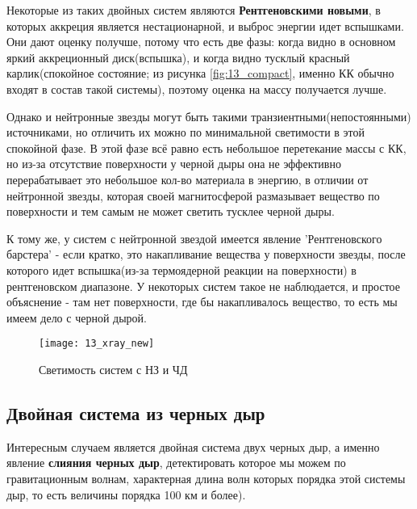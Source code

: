Некоторые из таких двойных систем являются \textbf{Рентгеновскими новыми}, в которых аккреция является нестационарной, и выброс энергии идет вспышками. Они дают оценку получше, потому что есть две фазы: когда видно в основном яркий аккреционный диск(вспышка), и когда видно тусклый красный карлик(спокойное состояние; из рисунка \ref{fig:13_compact}, именно КК обычно входят в состав такой системы), поэтому оценка на массу получается лучше.

Однако и нейтронные звезды могут быть такими транзиентными(непостоянными) источниками, но отличить их можно по минимальной светимости в этой спокойной фазе. В этой фазе всё равно есть небольшое перетекание массы с КК, но из-за отсутствие поверхности у черной дыры она не эффективно перерабатывает это небольшое кол-во материала в энергию, в отличии от нейтронной звезды, которая своей магнитосферой размазывает вещество по поверхности и тем самым не может светить тусклее черной дыры.

К тому же, у систем с нейтронной звездой имеется явление 'Рентгеновского барстера' - если кратко, это накапливание вещества у поверхности звезды, после которого идет вспышка(из-за термоядерной реакции на поверхности) в рентгеновском диапазоне. У некоторых систем такое не наблюдается, и простое объяснение - там нет поверхности, где бы накапливалось вещество, то есть мы имеем дело с черной дырой.

\begin{figure}[H]
	\centering
	\texttt{[image: 13\_xray\_new]}
	\caption{Светимость систем с НЗ и ЧД}
	\label{fig:13_xray_new}
\end{figure}

\subsection{Двойная система из черных дыр}

Интересным случаем является двойная система двух черных дыр, а именно явление \textbf{слияния черных дыр}, детектировать которое мы можем по гравитационным волнам, характерная длина волн которых порядка этой системы дыр, то есть величины порядка 100 км и более).
